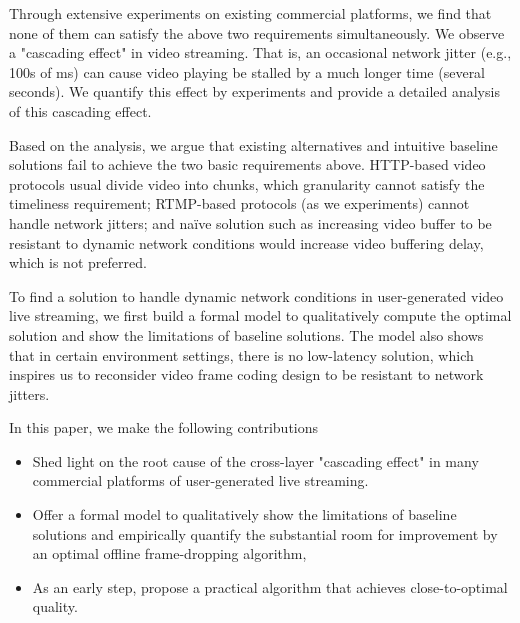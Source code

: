 Through extensive experiments on existing commercial platforms, we find that none of them can satisfy the above two requirements simultaneously. We observe a "cascading effect" in video streaming. That is, an occasional network jitter (e.g., 100s of ms) can cause video playing be stalled by a much longer time (several seconds). We quantify this effect by experiments and provide a detailed analysis of this cascading effect.

Based on the analysis, we argue that existing alternatives and intuitive baseline solutions fail to achieve the two basic requirements above. HTTP-based video protocols usual divide video into chunks, which granularity cannot satisfy the timeliness requirement; RTMP-based protocols (as we experiments) cannot handle network jitters; and naïve solution such as increasing video buffer to be resistant to dynamic network conditions would increase video buffering delay, which is not preferred.

To find a solution to handle dynamic network conditions in user-generated video live streaming, we first build a formal model to qualitatively compute the optimal solution and show the limitations of baseline solutions. The model also shows that in certain environment settings, there is no low-latency solution, which inspires us to reconsider video frame coding design to be resistant to network jitters.

In this paper, we make the following contributions
\begin{itemize}
\item Shed light on the root cause of the cross-layer "cascading effect" in many commercial platforms of user-generated live streaming.
\item Offer a formal model to qualitatively show the limitations of baseline solutions and empirically quantify the substantial room for improvement by an optimal offline frame-dropping algorithm,
\item As an early step, propose a practical algorithm that achieves close-to-optimal quality.
\end{itemize}


\fi
\iffalse


